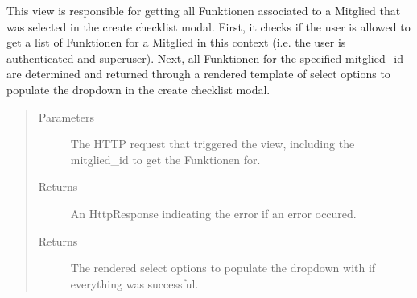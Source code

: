 \documentclass[letterpaper,10pt,english]{sphinxmanual}
\begin{document}
\begin{fulllineitems}
\label{\detokenize{masterCodeDoc:checklisten.views.get_funktionen}}
This view is responsible for getting all Funktionen associated to a Mitglied that was selected in the create checklist modal.
First, it checks if the user is allowed to get a list of Funktionen for a Mitglied in this context (i.e. the user is authenticated and superuser).
Next, all Funktionen for the specified mitglied\_id are determined and returned through a rendered template of select options to populate the dropdown in the create checklist modal.
\begin{quote}\begin{description}
\item[{Parameters}] \leavevmode
{} \textendash{} The HTTP request that triggered the view, including the mitglied\_id to get the Funktionen for.

\item[{Returns}] \leavevmode
An HttpResponse indicating the error if an error occured.

\item[{Returns}] \leavevmode
The rendered select options to populate the dropdown with if everything was successful.

\end{description}\end{quote}

\end{fulllineitems}

\end{document}
